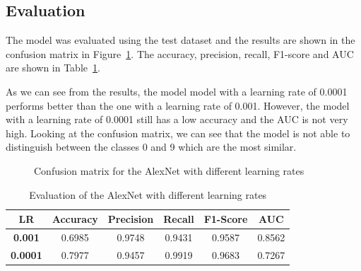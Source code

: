 \subsection{Evaluation}\label{sec:alexnet-evaluation}
The model was evaluated using the test dataset and the results are shown in the confusion matrix in Figure~\ref{fig:alexnet-confusion-matrix}.
The accuracy, precision, recall, F1-score and AUC are shown in Table~\ref{tab:results-alexnet}.

As we can see from the results, the model model with a learning rate of 0.0001 performs better than the one with a learning rate of 0.001.
However, the model with a learning rate of 0.0001 still has a low accuracy and the AUC is not very high.
Looking at the confusion matrix, we can see that the model is not able to distinguish between the classes 0 and 9 which are the most similar.

\begin{figure}[h]
    \centering
    \qquad
    \caption{Confusion matrix for the AlexNet with different learning rates}\label{fig:alexnet-confusion-matrix}
\end{figure}

\begin{table}[h]
    \centering
    \begin{tabular}{|c|c|c|c|c|c|}
        \hline
        \textbf{LR}     & \textbf{Accuracy} & \textbf{Precision} & \textbf{Recall} & \textbf{F1-Score} & \textbf{AUC} \\
        \hline
        \textbf{0.001}  & 0.6985            & 0.9748             & 0.9431          & 0.9587            & 0.8562       \\
        \hline
        \textbf{0.0001} & 0.7977            & 0.9457             & 0.9919          & 0.9683            & 0.7267       \\
        \hline
    \end{tabular}
    \caption{Evaluation of the AlexNet with different learning rates}\label{tab:results-alexnet}
\end{table}